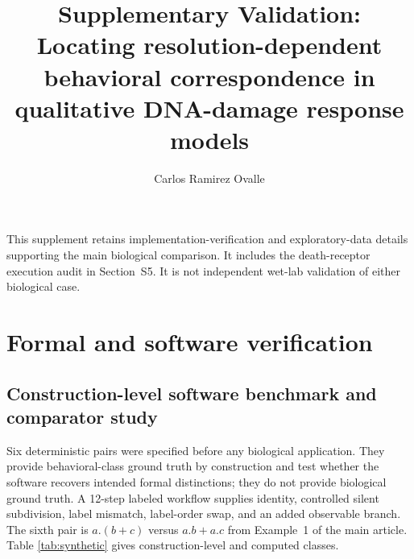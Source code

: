 \documentclass{ws-jbcb}
\numberwithin{equation}{section}
\begin{document}
\catchline{}{}{}{}{}
\title{Supplementary Validation: Locating resolution-dependent behavioral correspondence in qualitative DNA-damage response models}
\author{Carlos Ramirez Ovalle}
\address{Pontificia Universidad Javeriana Cali, Colombia}
\date{}
\maketitle
This supplement retains implementation-verification and exploratory-data
details supporting the main biological comparison. It includes the death-receptor execution audit in Section~S5. It is not independent wet-lab validation of either biological case.

\section{Formal and software verification}
\label{sec:computational-validation}

\subsection{Construction-level software benchmark and comparator study}
\label{sec:benchmark-method}

Six deterministic pairs were specified before any biological application. They
provide behavioral-class ground truth by construction and test whether the
software recovers intended formal distinctions; they do not provide biological
ground truth. A
12-step labeled workflow supplies identity, controlled silent subdivision, label
mismatch, label-order swap, and an added observable branch. The sixth pair is
$a.(b+c)$ versus $a.b+a.c$ from Example~1 of the main article. Table
\ref{tab:synthetic} gives construction-level and computed classes.

\begin{table}[t]
\end{table}
\end{document}
